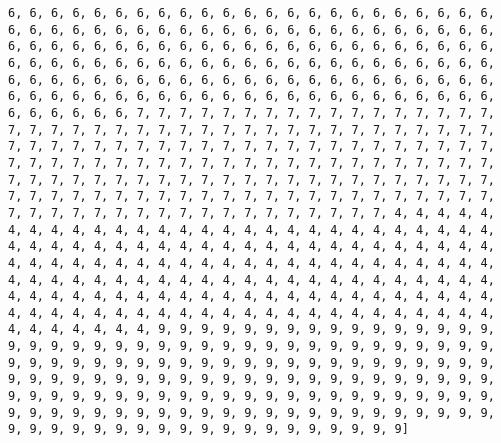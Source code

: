 \documentclass[11pt]{article}
\begin{document}
\begin{Verbatim}[commandchars=\\\{\}]
6, 6, 6, 6, 6, 6, 6, 6, 6, 6, 6, 6, 6, 6, 6, 6, 6, 6, 6, 6, 6, 6, 6, 6, 6, 6, 6, 6, 6, 6, 6, 6, 6, 6, 6, 6, 6, 6, 6, 6, 6, 6, 6, 6, 6, 6, 6, 6, 6, 6, 6, 6, 6, 6, 6, 6, 6, 6, 6, 6, 6, 6, 6, 6, 6, 6, 6, 6, 6, 6, 6, 6, 6, 6, 6, 6, 6, 6, 6, 6, 6, 6, 6, 6, 6, 6, 6, 6, 6, 6, 6, 6, 6, 6, 6, 6, 6, 6, 6, 6, 6, 6, 6, 6, 6, 6, 6, 6, 6, 6, 6, 6, 6, 6, 6, 6, 6, 6, 6, 6, 6, 6, 6, 6, 6, 6, 6, 6, 6, 6, 6, 6, 6, 6, 6, 6, 6, 6, 6, 6, 6, 6, 6, 6, 7, 7, 7, 7, 7, 7, 7, 7, 7, 7, 7, 7, 7, 7, 7, 7, 7, 7, 7, 7, 7, 7, 7, 7, 7, 7, 7, 7, 7, 7, 7, 7, 7, 7, 7, 7, 7, 7, 7, 7, 7, 7, 7, 7, 7, 7, 7, 7, 7, 7, 7, 7, 7, 7, 7, 7, 7, 7, 7, 7, 7, 7, 7, 7, 7, 7, 7, 7, 7, 7, 7, 7, 7, 7, 7, 7, 7, 7, 7, 7, 7, 7, 7, 7, 7, 7, 7, 7, 7, 7, 7, 7, 7, 7, 7, 7, 7, 7, 7, 7, 7, 7, 7, 7, 7, 7, 7, 7, 7, 7, 7, 7, 7, 7, 7, 7, 7, 7, 7, 7, 7, 7, 7, 7, 7, 7, 7, 7, 7, 7, 7, 7, 7, 7, 7, 7, 7, 7, 7, 7, 7, 7, 7, 7, 7, 7, 7, 7, 7, 7, 4, 4, 4, 4, 4, 4, 4, 4, 4, 4, 4, 4, 4, 4, 4, 4, 4, 4, 4, 4, 4, 4, 4, 4, 4, 4, 4, 4, 4, 4, 4, 4, 4, 4, 4, 4, 4, 4, 4, 4, 4, 4, 4, 4, 4, 4, 4, 4, 4, 4, 4, 4, 4, 4, 4, 4, 4, 4, 4, 4, 4, 4, 4, 4, 4, 4, 4, 4, 4, 4, 4, 4, 4, 4, 4, 4, 4, 4, 4, 4, 4, 4, 4, 4, 4, 4, 4, 4, 4, 4, 4, 4, 4, 4, 4, 4, 4, 4, 4, 4, 4, 4, 4, 4, 4, 4, 4, 4, 4, 4, 4, 4, 4, 4, 4, 4, 4, 4, 4, 4, 4, 4, 4, 4, 4, 4, 4, 4, 4, 4, 4, 4, 4, 4, 4, 4, 4, 4, 4, 4, 4, 4, 4, 4, 4, 4, 4, 4, 4, 4, 9, 9, 9, 9, 9, 9, 9, 9, 9, 9, 9, 9, 9, 9, 9, 9, 9, 9, 9, 9, 9, 9, 9, 9, 9, 9, 9, 9, 9, 9, 9, 9, 9, 9, 9, 9, 9, 9, 9, 9, 9, 9, 9, 9, 9, 9, 9, 9, 9, 9, 9, 9, 9, 9, 9, 9, 9, 9, 9, 9, 9, 9, 9, 9, 9, 9, 9, 9, 9, 9, 9, 9, 9, 9, 9, 9, 9, 9, 9, 9, 9, 9, 9, 9, 9, 9, 9, 9, 9, 9, 9, 9, 9, 9, 9, 9, 9, 9, 9, 9, 9, 9, 9, 9, 9, 9, 9, 9, 9, 9, 9, 9, 9, 9, 9, 9, 9, 9, 9, 9, 9, 9, 9, 9, 9, 9, 9, 9, 9, 9, 9, 9, 9, 9, 9, 9, 9, 9, 9, 9, 9, 9, 9, 9, 9, 9, 9, 9, 9, 9]

    \end{Verbatim}
\end{document}
